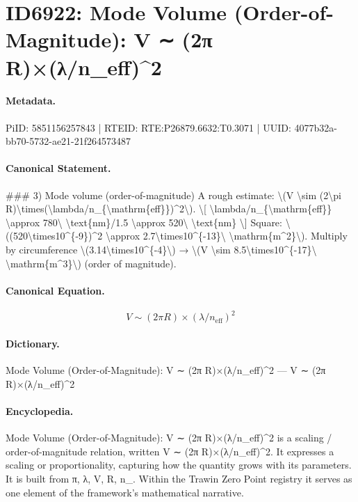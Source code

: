 \section*{ID6922: Mode Volume (Order-of-Magnitude): V ∼ (2π R)×(λ/n\_eff)\textasciicircum{}2}
\paragraph{Metadata.}
PiID: 5851156257843 | RTEID: RTE:P26879.6632:T0.3071 | UUID: 4077b32a-bb70-5732-ae21-21f264573487

\paragraph{Canonical Statement.}
\#\#\# 3) Mode volume (order-of-magnitude) A rough estimate: \textbackslash{}(V \textbackslash{}sim (2\textbackslash{}pi R)\textbackslash{}times(\textbackslash{}lambda/n\_\{\textbackslash{}mathrm\{eff\}\})\textasciicircum{}2\textbackslash{}). \textbackslash{}[ \textbackslash{}lambda/n\_\{\textbackslash{}mathrm\{eff\}\} \textbackslash{}approx 780\textbackslash{} \textbackslash{}text\{nm\}/1.5 \textbackslash{}approx 520\textbackslash{} \textbackslash{}text\{nm\} \textbackslash{}] Square: \textbackslash{}((520\textbackslash{}times10\textasciicircum{}\{-9\})\textasciicircum{}2 \textbackslash{}approx 2.7\textbackslash{}times10\textasciicircum{}\{-13\}\textbackslash{} \textbackslash{}mathrm\{m\textasciicircum{}2\}\textbackslash{}). Multiply by circumference \textbackslash{}(3.14\textbackslash{}times10\textasciicircum{}\{-4\}\textbackslash{}) → \textbackslash{}(V \textbackslash{}sim 8.5\textbackslash{}times10\textasciicircum{}\{-17\}\textbackslash{} \textbackslash{}mathrm\{m\textasciicircum{}3\}\textbackslash{}) (order of magnitude).

\paragraph{Canonical Equation.}
\[
V \sim (2\pi R)\times(\lambda/n_{\mathrm{eff}})^2
\]

\paragraph{Dictionary.}
Mode Volume (Order-of-Magnitude): V ∼ (2π R)×(λ/n\_eff)\textasciicircum{}2 — V ∼ (2π R)×(λ/n\_eff)\textasciicircum{}2

\paragraph{Encyclopedia.}
Mode Volume (Order-of-Magnitude): V ∼ (2π R)×(λ/n\_eff)\textasciicircum{}2 is a scaling / order-of-magnitude relation, written V ∼ (2π R)×(λ/n\_eff)\textasciicircum{}2. It expresses a scaling or proportionality, capturing how the quantity grows with its parameters. It is built from π, λ, V, R, n\_. Within the Trawin Zero Point registry it serves as one element of the framework's mathematical narrative.
